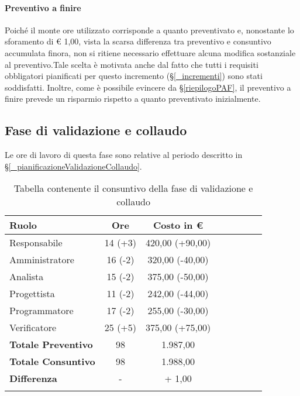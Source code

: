 \paragraph{Preventivo a finire}
Poiché il monte ore utilizzato corrisponde a quanto preventivato e, nonostante lo sforamento di € 1,00, vista la scarsa differenza tra preventivo e consuntivo accumulata finora, non si ritiene necessario effettuare alcuna modifica sostanziale al preventivo.Tale scelta è motivata anche dal fatto che tutti i requisiti obbligatori pianificati per questo incremento (\S\ref{_incrementi}) sono stati soddisfatti. Inoltre, come è possibile evincere da \S\ref{riepilogoPAF}, il preventivo a finire prevede un risparmio rispetto a quanto preventivato inizialmente.

\subsection{Fase di validazione e collaudo} \label{_consuntivoValidazione}
Le ore di lavoro di questa fase sono relative al periodo descritto in \S\ref{_pianificazioneValidazioneCollaudo}.

\begin{longtable}{|l|c|c|c|c|c|c|c|}
	\hline
	\rowcolor{lighter-grayer}
	\textbf{Ruolo}             & \textbf{Ore} & \textbf{Costo in €} \\
	\hline
	\endfirsthead

	\hline
	Responsabile               & 14 (+3)           & 420,00 (+90,00)              \\
	\hline
	\hline
	Amministratore             & 16 (-2)       & 320,00 (-40,00)      \\
	\hline
	\hline
	Analista                   & 15 (-2)       & 375,00 (-50,00)   \\
	\hline
	\hline
	Progettista                & 11 (-2)            & 242,00 (-44,00)             \\
	\hline
	\hline
	Programmatore              & 17 (-2)            & 255,00 (-30,00)                   \\
	\hline
	\hline
	Verificatore               & 25 (+5)       & 375,00 (+75,00)    \\
	\hline
	\textbf{Totale Preventivo} & 98          & 1.987,00            \\
	\hline
	\hline
	\textbf{Totale Consuntivo} & 98          & 1.988,00            \\
	\hline
	\hline
	\textbf{Differenza}        & -           & + 1,00           \\
	\hline
	\rowcolor{white}
	\caption{Tabella contenente il consuntivo della fase di validazione e collaudo}
\end{longtable}
